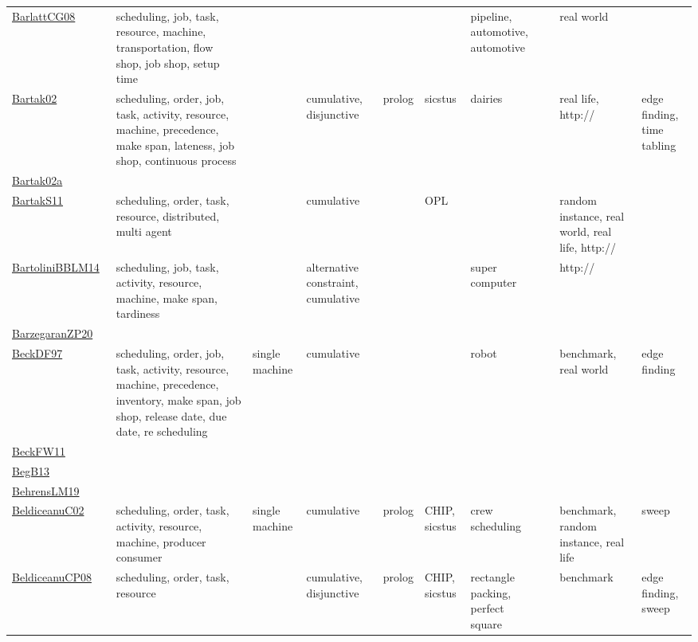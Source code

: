 {\begin{longtable}{p{3cm}p{4cm}p{2cm}p{2cm}p{2cm}p{2cm}p{2cm}p{2cm}p{2cm}p{2cm}}
\href{papers/BarlattCG08.pdf}{BarlattCG08}~\cite{BarlattCG08} & scheduling, job, task, resource, machine, transportation, flow shop, job shop, setup time &  &  &  &  & pipeline, automotive, automotive &  & real world & \\
\href{papers/Bartak02.pdf}{Bartak02}~\cite{Bartak02} & scheduling, order, job, task, activity, resource, machine, precedence, make span, lateness, job shop, continuous process &  & cumulative, disjunctive & prolog & sicstus & dairies &  & real life, http:// & edge finding, time tabling\\
\href{papers/Bartak02a.pdf}{Bartak02a}~\cite{Bartak02a} &  &  &  &  &  &  &  &  & \\
\href{articles/BartakS11.pdf}{BartakS11}~\cite{BartakS11} & scheduling, order, task, resource, distributed, multi agent &  & cumulative &  & OPL &  &  & random instance, real world, real life, http:// & \\
\href{papers/BartoliniBBLM14.pdf}{BartoliniBBLM14}~\cite{BartoliniBBLM14} & scheduling, job, task, activity, resource, machine, make span, tardiness &  & alternative constraint, cumulative &  &  & super computer &  & http:// & \\
\href{papers/BarzegaranZP20.pdf}{BarzegaranZP20}~\cite{BarzegaranZP20} &  &  &  &  &  &  &  &  & \\
\href{papers/BeckDF97.pdf}{BeckDF97}~\cite{BeckDF97} & scheduling, order, job, task, activity, resource, machine, precedence, inventory, make span, job shop, release date, due date, re scheduling & single machine & cumulative &  &  & robot &  & benchmark, real world & edge finding\\
\href{articles/BeckFW11.pdf}{BeckFW11}~\cite{BeckFW11} &  &  &  &  &  &  &  &  & \\
\href{articles/BegB13.pdf}{BegB13}~\cite{BegB13} &  &  &  &  &  &  &  &  & \\
\href{papers/BehrensLM19.pdf}{BehrensLM19}~\cite{BehrensLM19} &  &  &  &  &  &  &  &  & \\
\href{papers/BeldiceanuC02.pdf}{BeldiceanuC02}~\cite{BeldiceanuC02} & scheduling, order, task, activity, resource, machine, producer consumer & single machine & cumulative & prolog & CHIP, sicstus & crew scheduling &  & benchmark, random instance, real life & sweep\\
\href{papers/BeldiceanuCP08.pdf}{BeldiceanuCP08}~\cite{BeldiceanuCP08} & scheduling, order, task, resource &  & cumulative, disjunctive & prolog & CHIP, sicstus & rectangle packing, perfect square &  & benchmark & edge finding, sweep\\

\end{longtable}}
